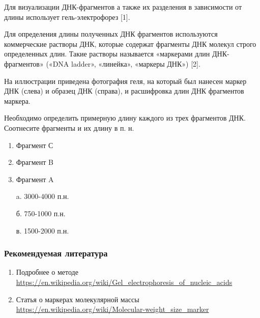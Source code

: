 
Для визуализации ДНК-фрагментов а также их разделения в зависимости от длины использует гель-электрофорез [1].

Для определения длины полученных ДНК фрагментов используются коммерческие растворы ДНК, которые содержат фрагменты ДНК молекул строго определенных длин. Такие растворы называется «маркерами длин ДНК-фрагментов» («DNA ladder», «линейка», «маркеры ДНК») [2].

На иллюстрации приведена фотография геля, на который был нанесен маркер ДНК (слева) и образец ДНК (справа), и расшифровка длин ДНК фрагментов маркера.


Необходимо определить примерную длину каждого из трех фрагментов ДНК. Соотнесите фрагменты и их длину в п. н.

\begin{multicols}{2}
    {
        \begin{enumerate}
            \item Фрагмент С
            \item Фрагмент B
            \item Фрагмент A
        \end{enumerate}
    }
    {
        \begin{enumerate}
            \item[a.] 3000-4000 п.н.
            \item[б.] 750-1000 п.н.
            \item[в.] 1500-2000 п.н.  
        \end{enumerate}
    }
    
\end{multicols}


\subsubsection*{Рекомендуемая литература}

\begin{enumerate}
    \item Подробнее о методе \url{https://en.wikipedia.org/wiki/Gel_electrophoresis_of_nucleic_acids}
    \item Статья о маркерах молекулярной массы \url{https://en.wikipedia.org/wiki/Molecular-weight_size_marker}
\end{enumerate}

\explanationSection


\explanationSection

\answerMath{}